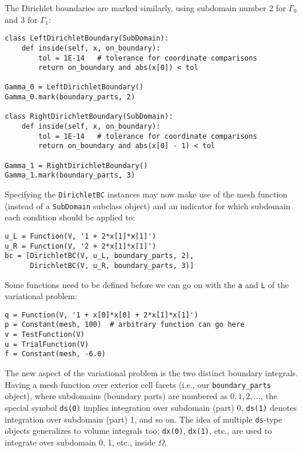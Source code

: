 The Dirichlet boundaries are marked similarly, using subdomain number 2 for $\Gamma_0$ and 3 for $\Gamma_1$:
\begin{Verbatim}[fontsize=\fontsize{10pt}{10pt},tabsize=8,baselinestretch=1.05,
fontfamily=tt,xleftmargin=7mm]
class LeftDirichletBoundary(SubDomain):
    def inside(self, x, on_boundary):
        tol = 1E-14   # tolerance for coordinate comparisons
        return on_boundary and abs(x[0]) < tol

Gamma_0 = LeftDirichletBoundary()
Gamma_0.mark(boundary_parts, 2)

class RightDirichletBoundary(SubDomain):
    def inside(self, x, on_boundary):
        tol = 1E-14   # tolerance for coordinate comparisons
        return on_boundary and abs(x[0] - 1) < tol

Gamma_1 = RightDirichletBoundary()
Gamma_1.mark(boundary_parts, 3)
\end{Verbatim}
\noindent
Specifying the {\fontsize{12pt}{12pt}\texttt{DirichletBC}} instances may now make use of
the mesh function (instead of a {\fontsize{12pt}{12pt}\texttt{SubDomain}} subclass object) 
and an indicator for which subdomain each condition
should be applied to:
\begin{Verbatim}[fontsize=\fontsize{10pt}{10pt},tabsize=8,baselinestretch=1.05,
fontfamily=tt,xleftmargin=7mm]
u_L = Function(V, '1 + 2*x[1]*x[1]')
u_R = Function(V, '2 + 2*x[1]*x[1]')
bc = [DirichletBC(V, u_L, boundary_parts, 2),
      DirichletBC(V, u_R, boundary_parts, 3)]
\end{Verbatim}
\noindent

Some functions need to be defined before we can go on with the
{\fontsize{12pt}{12pt}\texttt{a}} and {\fontsize{12pt}{12pt}\texttt{L}} of the variational problem:
\begin{Verbatim}[fontsize=\fontsize{10pt}{10pt},tabsize=8,baselinestretch=1.05,
fontfamily=tt,xleftmargin=7mm]
q = Function(V, '1 + x[0]*x[0] + 2*x[1]*x[1]')
p = Constant(mesh, 100)  # arbitrary function can go here
v = TestFunction(V)
u = TrialFunction(V)
f = Constant(mesh, -6.0)
\end{Verbatim}
\noindent

The new aspect of the variational problem is the two distinct
boundary integrals.
Having a mesh function over exterior cell facets (i.e., our
{\fontsize{12pt}{12pt}\verb!boundary_parts!} object), where subdomains (boundary parts) are
numbered as $0,1,2,\ldots$, the special symbol {\fontsize{12pt}{12pt}\texttt{ds(0)}}
implies integration over subdomain (part) 0, {\fontsize{12pt}{12pt}\texttt{ds(1)}} denotes
integration over subdomain (part) 1, and so on.
The idea of multiple {\fontsize{12pt}{12pt}\texttt{ds}}-type objects generalizes to volume
integrals too: {\fontsize{12pt}{12pt}\texttt{dx(0)}}, {\fontsize{12pt}{12pt}\texttt{dx(1)}}, etc., are used to
integrate over subdomain 0, 1, etc.,  inside $\Omega$.

